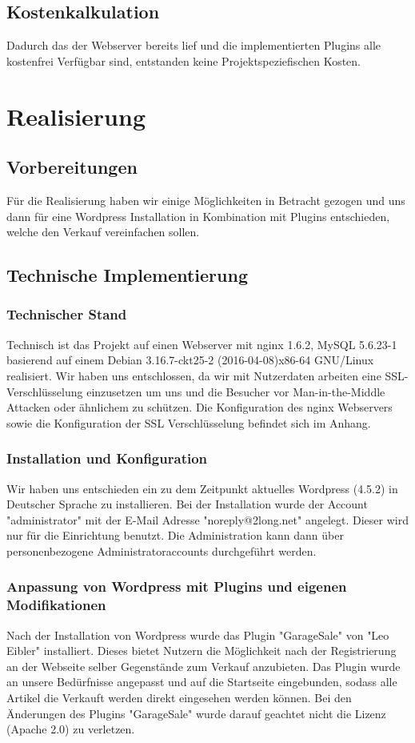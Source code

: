 \documentclass[a4paper, DIV20, 11pt, headsepline, parskip]{article}
\begin{document}
\subsection{Kostenkalkulation}
Dadurch das der Webserver bereits lief und die implementierten Plugins alle kostenfrei Verfügbar sind, entstanden keine Projektspeziefischen Kosten.
\section{Realisierung}
\subsection{Vorbereitungen}
Für die Realisierung haben wir einige Möglichkeiten in Betracht gezogen und uns dann für eine Wordpress Installation in Kombination mit Plugins entschieden, welche den Verkauf vereinfachen sollen.
\subsection{Technische Implementierung}
\subsubsection{Technischer Stand}
Technisch ist das Projekt auf einen Webserver mit nginx 1.6.2,
MySQL 5.6.23-1 basierend auf einem
Debian 3.16.7-ckt25-2 (2016-04-08)x86-64 GNU/Linux 
realisiert.
Wir haben uns entschlossen, da wir mit Nutzerdaten arbeiten eine SSL-Verschlüsselung einzusetzen um uns und die Besucher vor Man-in-the-Middle Attacken oder ähnlichem zu schützen.
Die Konfiguration des nginx Webservers sowie die Konfiguration der SSL Verschlüsselung befindet sich im Anhang.
\subsubsection{Installation und Konfiguration}
Wir haben uns entschieden ein zu dem Zeitpunkt aktuelles Wordpress (4.5.2) in Deutscher Sprache zu installieren.
Bei der Installation wurde der Account "administrator" mit der E-Mail Adresse "noreply@2long.net" angelegt.
Dieser wird nur für die Einrichtung benutzt.
Die Administration kann dann über personenbezogene Administratoraccounts durchgeführt werden.
\subsubsection{Anpassung von Wordpress mit Plugins und eigenen Modifikationen}
Nach der Installation von Wordpress wurde das Plugin "GarageSale" von "Leo Eibler" installiert.
Dieses bietet Nutzern die Möglichkeit nach der Registrierung an der Webseite selber Gegenstände zum Verkauf anzubieten.
Das Plugin wurde an unsere Bedürfnisse angepasst und auf die Startseite eingebunden, sodass alle Artikel die Verkauft werden direkt eingesehen werden können.
Bei den Änderungen des Plugins "GarageSale" wurde darauf geachtet nicht die Lizenz (Apache 2.0) zu verletzen.
\end{document}
